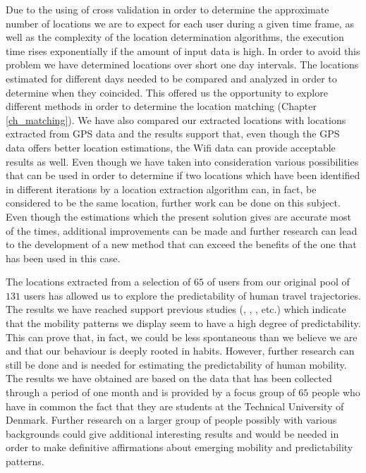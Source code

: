 Due to the using of cross validation in order to determine the approximate
number of locations we are to expect for each user during a given time frame, as well
as the complexity of the location determination algorithms, the execution time
rises exponentially if the amount of input data is high. In order to avoid this
problem we have determined locations over short one day intervals. The locations
estimated for different days needed to be compared and analyzed in order to
determine when they coincided. This offered us the opportunity to explore
different methods in order to determine the location matching (Chapter
\ref{ch_matching}). We have also compared our extracted locations with locations
extracted from GPS data and the results support that, even though the GPS data
offers better location estimations, the Wifi data can provide acceptable results
as well. Even though we have taken into consideration various possibilities that
can be used in order to determine if two locations which have been identified in
different iterations by a location extraction algorithm can, in fact, be
considered to be the same location, further work can be done on this subject.
Even though the estimations which the present solution gives are accurate most
of the times, additional improvements can be made and further research can lead
to the development of a new method that can exceed the benefits of the one that
has been used in this case.

The locations extracted from a selection of $65$ of users from our original pool
of $131$ users has allowed us to explore the predictability of human travel
trajectories. The results we have reached support previous studies
(\cite{Barabasi10}, \cite{Barabasi08}, \cite{Sinatra14}, \cite{Brockmann06}
etc.) which indicate that the mobility patterns we display seem to have a high
degree of predictability. This can prove that, in fact, we could be less
spontaneous than we believe we are and that our behaviour is deeply rooted in
habits. However, further research can still be done and is needed for estimating
the predictability of human mobility. The results we have obtained are based on
the data that has been collected through a period of one month and is provided
by a focus group of $65$ people who have in common the fact that they are
students at the Technical University of Denmark. Further research on a larger
group of people possibly with various backgrounds could give additional
interesting results and would be needed in order to make definitive affirmations
about emerging mobility and predictability patterns.

